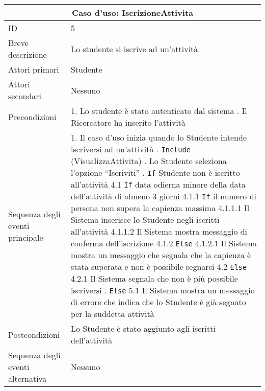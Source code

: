 \documentclass[11pt,a4paper]{report}
\begin{document}
\begin{table}[h!]
\centering
\renewcommand{\arraystretch}{1.3}
\begin{tabular}{|p{4cm}|p{10cm}|}
\hline
\multicolumn{2}{|c|}{\textbf{Caso d’uso: IscrizioneAttivita}} \\ \hline
ID & 5 \\ \hline
Breve descrizione & Lo studente si iscrive ad un'attività \\ \hline
Attori primari & Studente \\ \hline
Attori secondari & Nessuno \\ \hline
Precondizioni &
1. Lo studente è stato autenticato dal sistema \newline
2. Il Ricercatore ha inserito l'attività \\ \hline
Sequenza degli eventi principale &
1. Il caso d’uso inizia quando lo Studente intende iscriversi ad un'attività \newline
2. \texttt{Include} (VisualizzaAttivita) \newline
3. Lo Studente seleziona l’opzione “Iscriviti” \newline
4. \texttt{If} Studente non è iscritto all'attività \newline
\hspace*{0.5cm} 4.1 \texttt{If} data odierna minore della data dell'attività di almeno 3 giorni \newline
\hspace*{1cm} 4.1.1 \texttt{If} il numero di persona non supera la capienza massima \newline
\hspace*{1.5cm} 4.1.1.1 Il Sistema inserisce lo Studente negli iscritti all'attività \newline
\hspace*{1.5cm} 4.1.1.2 Il Sistema mostra messaggio di conferma dell’iscrizione \newline
\hspace*{1cm} 4.1.2 \texttt{Else} \newline
\hspace*{1.5cm} 4.1.2.1 Il Sistema mostra un messaggio che segnala che la capienza è stata superata e non è possibile segnarsi \newline
\hspace*{0.5cm} 4.2 \texttt{Else} \newline
\hspace*{1cm} 4.2.1 Il Sistema segnala che non è più possibile iscriversi \newline
5. \texttt{Else} \newline
\hspace*{0.5cm} 5.1 Il Sistema mostra un messaggio di errore che indica che lo Studente è già segnato per la suddetta attività \\ \hline
Postcondizioni & Lo Studente è stato aggiunto agli iscritti dell'attività \\ \hline
Sequenza degli eventi alternativa & Nessuno \\ \hline
\end{tabular}
\end{table}
\newpage
\end{document}
